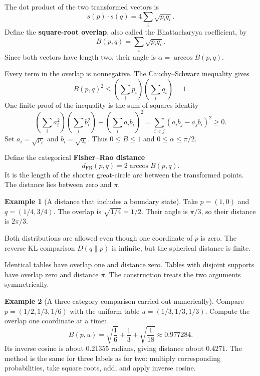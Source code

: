 \documentclass[11pt,oneside,openany]{book}
\theoremstyle{definition}
\newtheorem{example}{Example}[chapter]
\theoremstyle{remark}
\numberwithin{equation}{chapter}
\begin{document}
The dot product of the two transformed vectors is \[s(p)\cdot s(q)=4\sum_i\sqrt{p_iq_i}.\] Define the \textbf{square-root overlap}, also called the Bhattacharyya coefficient, by \[B(p,q)=\sum_i\sqrt{p_iq_i}.\] Since both vectors have length two, their angle is \(\alpha=\arccos B(p,q)\).

Every term in the overlap is nonnegative. The Cauchy--Schwarz inequality gives \[B(p,q)^2\leq\left(\sum_i p_i\right)\left(\sum_i q_i\right)=1.\] One finite proof of the inequality is the sum-of-squares identity \[\left(\sum_i a_i^2\right)\left(\sum_i b_i^2\right)
-\left(\sum_i a_ib_i\right)^2
=\sum_{i<j}(a_ib_j-a_jb_i)^2\geq0.\] Set \(a_i=\sqrt{p_i}\) and \(b_i=\sqrt{q_i}\). Thus \(0\leq B\leq1\) and \(0\leq\alpha\leq\pi/2\).

Define the categorical \textbf{Fisher--Rao distance} \[\boxed{d_{\mathrm{FR}}(p,q)=2\arccos B(p,q).}\] It is the length of the shorter great-circle arc between the transformed points. The distance lies between zero and \(\pi\).

\begin{example}[A distance that includes a boundary state]

Take \(p=(1,0)\) and \(q=(1/4,3/4)\). The overlap is \(\sqrt{1/4}=1/2\). Their angle is \(\pi/3\), so their distance is \(2\pi/3\).

Both distributions are allowed even though one coordinate of \(p\) is zero. The reverse KL comparison \(D(q\|p)\) is infinite, but the spherical distance is finite.

\end{example}

Identical tables have overlap one and distance zero. Tables with disjoint supports have overlap zero and distance \(\pi\). The construction treats the two arguments symmetrically.

\begin{example}[A three-category comparison carried out numerically]

Compare \(p=(1/2,1/3,1/6)\) with the uniform table \(u=(1/3,1/3,1/3)\). Compute the overlap one coordinate at a time: \[B(p,u)=\sqrt{\frac16}+\frac13+\sqrt{\frac1{18}}
\approx0.977284.\] Its inverse cosine is about \(0.21355\) radians, giving distance about \(0.4271\). The method is the same for three labels as for two: multiply corresponding probabilities, take square roots, add, and apply inverse cosine.

\end{example}
\end{document}
